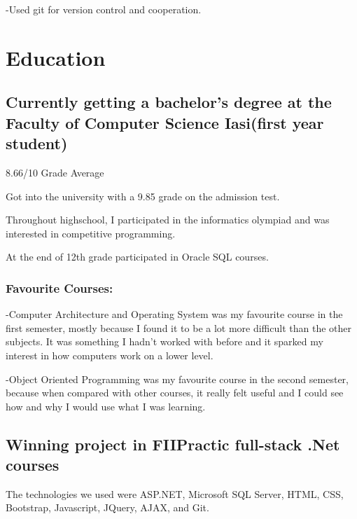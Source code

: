 \documentclass[a4paper,hidelinks,12pt]{article}
\begin{document}
-Used git for version control and cooperation.
\section{Education}
\subsection{Currently getting a bachelor's degree at 
the Faculty of Computer Science Iasi(first year student)}
 8.66/10 Grade Average

Got into the university with a 9.85 grade on the admission test.

Throughout highschool, I participated in the informatics olympiad and was interested in competitive programming.

At the end of 12th grade participated in Oracle SQL courses.
 
 \subsubsection{Favourite Courses:} 
 -Computer Architecture and Operating System was my favourite course in the first semester, mostly because I 
 found it to be a lot more difficult than the other subjects. It was something I hadn't worked with before
 and it sparked my interest in how computers work on a lower level.

 -Object Oriented Programming was my favourite course in the second semester, because when compared
 with other courses, it really felt useful and I could see how and why I would use what I was learning.


\subsection{Winning project in FIIPractic full-stack .Net courses}

The technologies we used were ASP.NET, Microsoft SQL Server, HTML, CSS, Bootstrap, Javascript,
JQuery, AJAX, and Git. 
\end{document}

